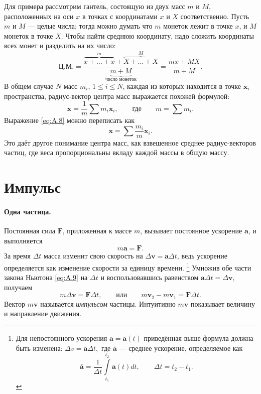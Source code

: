 Для примера рассмотрим гантель, состоящую из двух масс $m$ и $M$, расположенных на оси $x$ в точках с координатами $x$ и $X$ соответственно.
Пусть $m$ и $M$ --- целые числа;
тогда можно думать что $m$ монеток лежит в точке $x$,
и $M$ монеток в точке $X$.
Чтобы найти среднюю координату, надо сложить координаты всех монет и разделить на их число:
\[
\text{Ц.М.} =
\frac{\overbrace{x + \dots + x}^{m} + \overbrace{X + \dots + X}^{M}}{\underbrace{m+M}_{\text{число монеток}}}
=\frac{mx + MX}{m+M}.
\]
В общем случае $N$ масс $m_i$, $1 \le i \le N$, каждая из
которых находится в точке $\mathbf{x}_i$ пространства, радиус-вектор
центра масс выражается похожей формулой:
\begin{equation}
    \mathbf{x} = \frac{1}{m} \sum m_i  \mathbf{x}_i,
    \qquad\text{где}\qquad m = \sum m_i.
    \label{eq:A.8}
\end{equation}
Выражение \eqref{eq:A.8} можно переписать как
\[
\mathbf{x} = \sum \frac{m_i}{m}  \mathbf{x}_i.
\]
Это даёт другое понимание центра масс, как взвешенное среднее радиус-векторов частиц, где веса пропорциональны вкладу каждой массы в общую массу.

\section{Импульс}\label{Импульс}\label{sec:A.4}

\paragraph{Одна частица.}
Постоянная сила $\mathbf{F}$, приложенная
к массе $m$, вызывает постоянное ускорение $\mathbf{a}$, и выполняется
\begin{equation}
    m \mathbf{a} = \mathbf{F}.
    \label{eq:A.9}
\end{equation}
За время $\Delta t$ масса изменит свою скорость на
$\Delta \mathbf{v} = \mathbf{a}\Delta t$, ведь ускорение определяется как изменение скорости за единицу времени.%
\footnote{Для непостоянного ускорения $\mathbf{a}= \mathbf{a}(t)$ приведённая выше формула должна быть изменена: $\Delta v = \bar{\mathbf{a}}  \Delta t,$
где $\bar{\mathbf{a}}$ --- среднее ускорение, определяемое как
\[
\bar{\mathbf{a}} = \frac{1}{\Delta t} \int\limits_{t_1}^{t_2} \mathbf{a}(t) dt,
\qquad \Delta t = t_2 - t_1.
\]
}
Умножив обе части закона Ньютона \eqref{eq:A.9} на $\Delta t$
и воспользовавшись равенством $\mathbf{a}\Delta t = \Delta \mathbf{v}$, получаем
\begin{equation}
m \Delta \mathbf{v} = \mathbf{F}\Delta t,
\qquad \text{или} \qquad
m \mathbf{v}_2 - m \mathbf{v}_1 = \mathbf{F}\Delta t.
\label{eq:A.10}
\end{equation}
Вектор $m\mathbf{v}$ называется \textit{импульсом} частицы.
Интуитивно $m\mathbf{v}$ показывает величину и направление движения.

